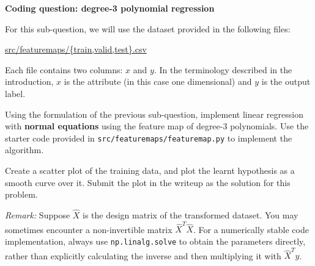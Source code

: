 \item {} {\bf Coding question: degree-3 polynomial regression}


For this sub-question, we will use the dataset provided in
the following files:
%
\begin{center}
	\url{src/featuremaps/{train,valid,test}.csv}
\end{center}
%

Each file contains two columns: $x$ and $y$. In the terminology described in the introduction, $x$ is the attribute (in this case one dimensional) and $y$ is the output label.

Using the formulation of the previous sub-question, implement linear regression with \textbf{normal equations} using the feature map of degree-3 polynomials. Use the starter code provided in \texttt{src/featuremaps/featuremap.py} to implement the algorithm.

Create a scatter plot of the training data, and plot the learnt hypothesis as a smooth curve over it. Submit the plot in the writeup as the solution for this problem.

\emph{Remark: } Suppose $\widehat{X}$ is the design matrix of the transformed dataset. You may sometimes encounter a non-invertible matrix $\widehat{X}^T\widehat{X}$. For a numerically stable code implementation, always use \texttt{np.linalg.solve} to obtain the parameters directly, rather than explicitly calculating the inverse and then multiplying it with $\widehat{X}^Ty$.


